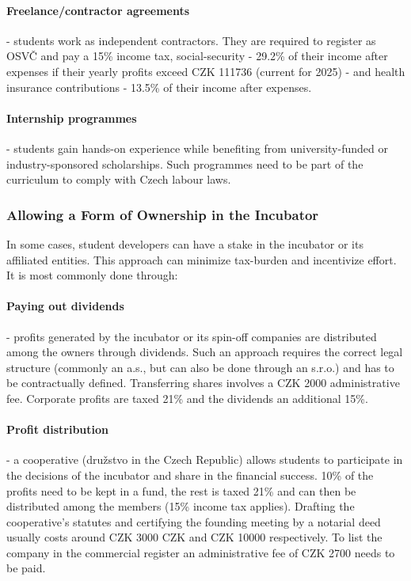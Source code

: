 \paragraph{Freelance/contractor agreements} - students work as independent contractors. They are required to register as OSVČ and pay a 15\% income tax, social-security - 29.2\% of their income after expenses if their yearly profits exceed CZK 111736 (current for 2025) - and health insurance contributions - 13.5\% of their income after expenses.
\paragraph{Internship programmes} - students gain hands-on experience while benefiting from university-funded or industry-sponsored scholarships. Such programmes need to be part of the curriculum to comply with Czech labour laws.

\subsubsection{Allowing a Form of Ownership in the Incubator}
In some cases, student developers can have a stake in the incubator or its affiliated entities. This approach can minimize tax-burden and incentivize effort. It is most commonly done through:
\paragraph{Paying out dividends} - profits generated by the incubator or its spin-off companies are distributed among the owners through dividends. Such an approach requires the correct legal structure (commonly an a.s., but can also be done through an s.r.o.) and has to be contractually defined. Transferring shares involves a CZK 2000 administrative fee. Corporate profits are taxed 21\% and the dividends an additional 15\%.
\paragraph{Profit distribution} - a cooperative (družstvo in the Czech Republic) allows students to participate in the decisions of the incubator and share in the financial success. 10\% of the profits need to be kept in a fund, the rest is taxed 21\% and can then be distributed among the members (15\% income tax applies). Drafting the cooperative's statutes and certifying the founding meeting by a notarial deed usually costs around CZK 3000 CZK and CZK 10000 respectively. To list the company in the commercial register an administrative fee of CZK 2700 needs to be paid.


